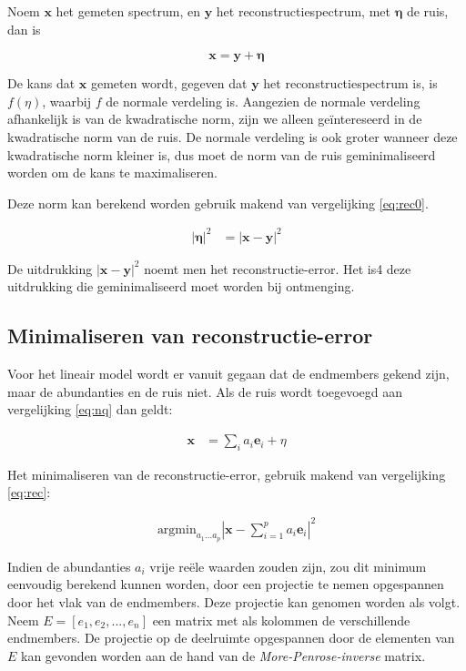 \documentclass[12pt]{report}
\begin{document}
Noem $\bm{x}$ het gemeten spectrum, en $\bm{y}$ het reconstructiespectrum, met $\bm{\eta}$ de ruis, dan is

\begin{equation}\label{eq:rec0}
\bm{x} = \bm{y} + \bm{\eta}
\end{equation}

De kans dat $\bm{x}$ gemeten wordt, gegeven dat $\bm{y}$ het reconstructiespectrum is, is $f(\eta)$, waarbij $f$ de normale verdeling is. Aangezien de normale verdeling afhankelijk is van de kwadratische norm, zijn we alleen ge\"intereseerd in de kwadratische norm van de ruis. De normale verdeling is ook groter wanneer deze kwadratische norm kleiner is, dus moet de norm van de ruis geminimaliseerd worden om de kans te maximaliseren.  

Deze norm kan berekend worden gebruik makend van vergelijking \ref{eq:rec0}.

\begin{eqnarray}
\left|\bm{\eta}\right|^2 &= \left|\bm{x} - \bm{y}\right|^2 \label{eq:rec}
\end{eqnarray}

De uitdrukking $\left|\bm{x} - \bm{y}\right|^2$ noemt men het reconstructie-error. Het is4 deze uitdrukking die geminimaliseerd moet worden bij ontmenging. 


\subsection{Minimaliseren van reconstructie-error}
Voor het lineair model wordt er vanuit gegaan dat de endmembers gekend zijn, maar de abundanties en de ruis niet. Als de ruis wordt toegevoegd aan vergelijking \ref{eq:nq} dan geldt:

\begin{align}
\bm{x} &= \sum_i a_i \bm{e}_i + \eta
\end{align}

Het minimaliseren van de reconstructie-error, gebruik makend van vergelijking \ref{eq:rec}:

\begin{align}
\text{argmin}_{a_1 ... a_p} \left| \bm{x} - \sum_{i=1}^p a_i \bm{e}_i\right|^2
\end{align}

Indien de abundanties $a_i$ vrije re\"ele waarden zouden zijn, zou dit minimum eenvoudig berekend kunnen worden, door een projectie te nemen opgespannen door het vlak van de endmembers. Deze projectie kan genomen worden als volgt. Neem $E = [e_1,e_2,...,e_n]$ een matrix met als kolommen de verschillende endmembers. De projectie op de deelruimte opgespannen door de elementen van $E$ kan gevonden worden aan de hand van de \textit{More-Penrose-inverse} matrix.
\end{document}
